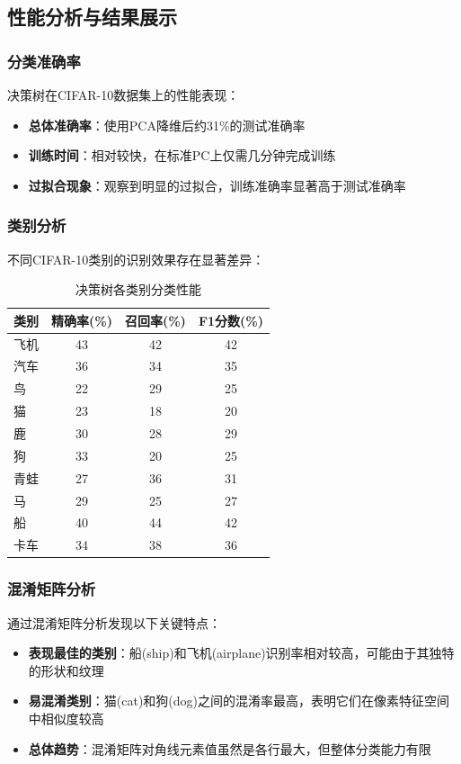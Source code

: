 \documentclass[UTF8]{report}
\theoremstyle{MyLineTheoremStyle} %
\theoremstyle{MyBlockTheoremStyle} %
\theoremstyle{MySubsubsectionStyle} %
\begin{document}
\subsection{性能分析与结果展示}

\subsubsection{分类准确率}
决策树在CIFAR-10数据集上的性能表现：

\begin{itemize}
    \item \textbf{总体准确率}：使用PCA降维后约31\%的测试准确率
    \item \textbf{训练时间}：相对较快，在标准PC上仅需几分钟完成训练
    \item \textbf{过拟合现象}：观察到明显的过拟合，训练准确率显著高于测试准确率
\end{itemize}

\subsubsection{类别分析}
不同CIFAR-10类别的识别效果存在显著差异：

\begin{table}[h]
\centering
\caption{决策树各类别分类性能}
\begin{tabular}{l c c c}
\toprule
\textbf{类别} & \textbf{精确率(\%)} & \textbf{召回率(\%)} & \textbf{F1分数(\%)} \\
\midrule
飞机 & 43 & 42 & 42 \\
汽车 & 36 & 34 & 35 \\
鸟 & 22 & 29 & 25 \\
猫 & 23 & 18 & 20 \\
鹿 & 30 & 28 & 29 \\
狗 & 33 & 20 & 25 \\
青蛙 & 27 & 36 & 31 \\
马 & 29 & 25 & 27 \\
船 & 40 & 44 & 42 \\
卡车 & 34 & 38 & 36 \\
\bottomrule
\end{tabular}
\end{table}

\subsubsection{混淆矩阵分析}
通过混淆矩阵分析发现以下关键特点：
\begin{itemize}
    \item \textbf{表现最佳的类别}：船(ship)和飞机(airplane)识别率相对较高，可能由于其独特的形状和纹理
    \item \textbf{易混淆类别}：猫(cat)和狗(dog)之间的混淆率最高，表明它们在像素特征空间中相似度较高
    \item \textbf{总体趋势}：混淆矩阵对角线元素值虽然是各行最大，但整体分类能力有限
\end{itemize}
\end{document}
